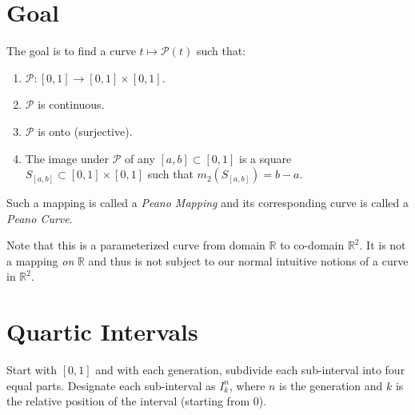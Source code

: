 \documentclass[letterpaper,12pt,fleqn]{article}
\newcommand{\uint}{[0,1]}
\newcommand{\usq}{\uint\times\uint}
\newcommand{\pc}{\mathcal{P}}
\newcommand{\tick}[1]{\draw (#1,-0.1) -- (#1,0.1)}
\begin{document}
\newpage

\section*{Goal}

The goal is to find a curve $t\mapsto\pc(t)$ such that:
\begin{enumerate}
\item $\pc:\uint\to\usq$.
\item $\pc$ is continuous.
\item $\pc$ is onto (surjective).
\item The image under $\pc$ of any $[a,b]\subset\uint$ is a square
$S_{[a,b]}\subset\usq$ such that $m_2(S_{[a,b]})=b-a$.
\end{enumerate}


Such a mapping is called a \emph{Peano Mapping} and its corresponding curve is
called a \emph{Peano Curve}.

Note that this is a parameterized curve from domain $\mathbb{R}$ to co-domain
$\mathbb{R}^2$. It is not a mapping \emph{on} $\mathbb{R}$ and thus is not
subject to our normal intuitive notions of a curve in $\mathbb{R}^2$.

\newpage

\section*{Quartic Intervals}

Start with $\uint$ and with each generation, subdivide each sub-interval
into four equal parts.  Designate each sub-interval as $I_k^n$, where $n$ is
the generation and $k$ is the relative position of the interval (starting
from 0).

\end{document}
